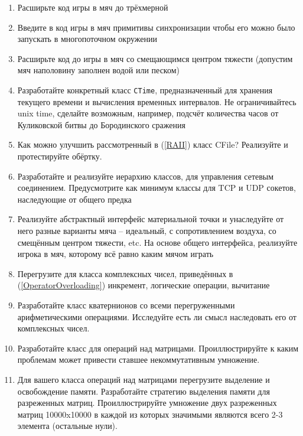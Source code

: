 \documentclass[a4paper,12pt,oneside]{article}
\begin{document}
\begin{enumerate}
\item
Расширьте код игры в мяч до трёхмерной 

\item
Введите в код игры в мяч примитивы синхронизации чтобы его можно было запускать в многопоточном окружении

\item
Расширьте код до игры в мяч со смещающимся центром тяжести (допустим мяч наполовину заполнен водой или песком)

\item
Разработайте конкретный класс \lstinline!CTime!, предназначенный для хранения текущего времени и вычисления временных интервалов. Не ограничивайтесь unix time, сделайте возможным, например, подсчёт количества часов от Куликовской битвы до Бородинского сражения

\item
Как можно улучшить рассмотренный в (\ref{RAII}) класс CFile? Реализуйте и протестируйте обёртку.

\item
Разработайте и реализуйте иерархию классов, для управления сетевым соединением. Предусмотрите как минимум классы для TCP и UDP сокетов, наследующие от общего предка

\item
Реализуйте абстрактный интерфейс материальной точки и унаследуйте от него разные варианты мяча -- идеальный, с сопротивлением воздуха, со смещённым центром тяжести, etc. На основе общего интерфейса, реализуйте игрока в мяч, которому всё равно каким мячом играть

\item
Перегрузите для класса комплексных чисел, приведённых в (\ref{OperatorOverloading}) инкремент, логические операции, вычитание

\item
Разработайте класс кватернионов со всеми перегруженными арифметическими операциями. Исследуйте есть ли смысл наследовать его от комплексных чисел.

\item
Разработайте класс для операций над матрицами. Проиллюстрируйте к каким проблемам может привести ставшее некоммутативным умножение.

\item
Для вашего класса операций над матрицами перегрузите выделение и освобождение памяти. Разработайте стратегию выделения памяти для разреженных матриц. Проиллюстрируйте умножение двух разреженных матриц 10000x10000 в каждой из которых значимыми являются всего 2-3 элемента (остальные нули).

\end{enumerate}
\end{document}

